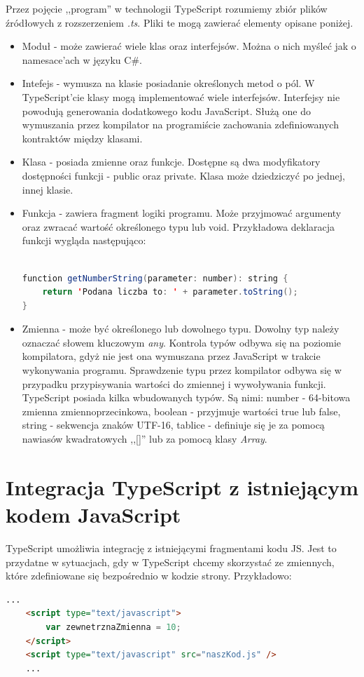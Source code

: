 Przez pojęcie ,,program'' w technologii TypeScript rozumiemy zbiór plików źródłowych z rozszerzeniem \textit{.ts}. Pliki te mogą zawierać elementy opisane poniżej.
\begin{itemize}
\item Moduł - może zawierać wiele klas oraz interfejsów. Można o nich myśleć jak o namesace'ach w języku C\#.
\item Intefejs - wymusza na klasie posiadanie określonych metod o pól. W TypeScript'cie klasy mogą implementować wiele interfejsów. Interfejsy nie powodują generowania dodatkowego kodu JavaScript. Służą one do wymuszania przez kompilator na programiście zachowania zdefiniowanych kontraktów między klasami.
\item Klasa - posiada zmienne oraz funkcje. Dostępne są dwa modyfikatory dostępności funkcji - public oraz private. Klasa może dziedziczyć po jednej, innej klasie.
\item Funkcja - zawiera fragment logiki programu. Może przyjmować argumenty oraz zwracać wartość określonego typu lub void. Przykładowa deklaracja funkcji wygląda następująco:\\\\


\begin{lstlisting}[language=Java]
function getNumberString(parameter: number): string {
	return 'Podana liczba to: ' + parameter.toString();
}
\end{lstlisting}
\item Zmienna - może być określonego lub dowolnego typu. Dowolny typ należy oznaczać słowem kluczowym \textit{any}. Kontrola typów odbywa się na poziomie kompilatora, gdyż nie jest ona wymuszana przez JavaScript w trakcie wykonywania programu. Sprawdzenie typu przez kompilator odbywa się w przypadku przypisywania wartości do zmiennej i wywoływania funkcji. TypeScript posiada kilka wbudowanych typów. Są nimi:
\subitem number - 64-bitowa zmienna zmiennoprzecinkowa,
\subitem boolean - przyjmuje wartości true lub false,
\subitem string - sekwencja znaków UTF-16,
\subitem tablice - definiuje się je za pomocą nawiasów kwadratowych ,,[]'' lub za pomocą klasy \textit{Array}.
\end{itemize}

\section{Integracja TypeScript z istniejącym kodem JavaScript}
TypeScript umożliwia integrację z istniejącymi fragmentami kodu JS. Jest to przydatne w sytuacjach, gdy w TypeScript chcemy skorzystać ze zmiennych, które zdefiniowane się bezpośrednio w kodzie strony. Przykładowo:
\begin{lstlisting}[language=HTML]
	...
	<script type="text/javascript">
		var zewnetrznaZmienna = 10;
	</script>
	<script type="text/javascript" src="naszKod.js" />
	...
\end{lstlisting}

